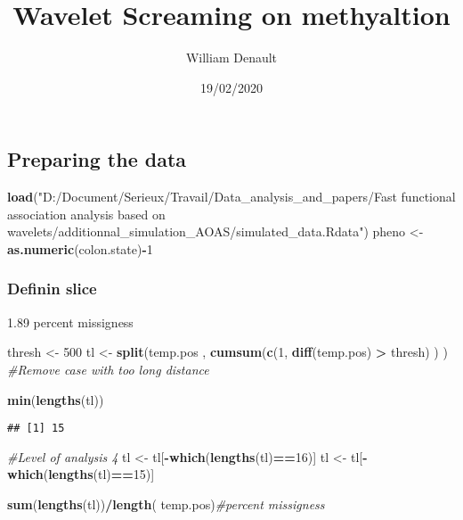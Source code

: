 \documentclass[
]{article}
\title{Wavelet Screaming on methyaltion}
\author{William Denault}
\date{19/02/2020}
\newenvironment{Shaded}{\begin{snugshade}}{\end{snugshade}}
\newcommand{\CommentTok}[1]{\textcolor[rgb]{0.56,0.35,0.01}{\textit{#1}}}
\newcommand{\DecValTok}[1]{\textcolor[rgb]{0.00,0.00,0.81}{#1}}
\newcommand{\KeywordTok}[1]{\textcolor[rgb]{0.13,0.29,0.53}{\textbf{#1}}}
\newcommand{\NormalTok}[1]{#1}
\newcommand{\OperatorTok}[1]{\textcolor[rgb]{0.81,0.36,0.00}{\textbf{#1}}}
\newcommand{\StringTok}[1]{\textcolor[rgb]{0.31,0.60,0.02}{#1}}
\begin{document}
\maketitle

\hypertarget{preparing-the-data}{%
\subsection{Preparing the data}\label{preparing-the-data}}

\begin{Shaded}
\begin{Highlighting}[]
\KeywordTok{load}\NormalTok{(}\StringTok{"D:/Document/Serieux/Travail/Data_analysis_and_papers/Fast functional association analysis based on wavelets/additionnal_simulation_AOAS/simulated_data.Rdata"}\NormalTok{)}
\NormalTok{pheno <-}\StringTok{ }\KeywordTok{as.numeric}\NormalTok{(colon.state)}\OperatorTok{-}\DecValTok{1}
\end{Highlighting}
\end{Shaded}

\hypertarget{definin-slice}{%
\subsubsection{Definin slice}\label{definin-slice}}

1.89 percent missigness

\begin{Shaded}
\begin{Highlighting}[]
\NormalTok{thresh <-}\StringTok{ }\DecValTok{500}
\NormalTok{tl <-}\StringTok{ }\KeywordTok{split}\NormalTok{(temp.pos , }\KeywordTok{cumsum}\NormalTok{(}\KeywordTok{c}\NormalTok{(}\DecValTok{1}\NormalTok{, }\KeywordTok{diff}\NormalTok{(temp.pos) }\OperatorTok{>}\StringTok{ }\NormalTok{thresh)  ) ) }\CommentTok{#Remove case with too long distance}

\KeywordTok{min}\NormalTok{(}\KeywordTok{lengths}\NormalTok{(tl))}
\end{Highlighting}
\end{Shaded}

\begin{verbatim}
## [1] 15
\end{verbatim}

\begin{Shaded}
\begin{Highlighting}[]
\CommentTok{#Level of analysis 4}
\NormalTok{tl <-}\StringTok{  }\NormalTok{tl[}\OperatorTok{-}\KeywordTok{which}\NormalTok{(}\KeywordTok{lengths}\NormalTok{(tl)}\OperatorTok{==}\DecValTok{16}\NormalTok{)]}
\NormalTok{tl <-}\StringTok{  }\NormalTok{tl[}\OperatorTok{-}\KeywordTok{which}\NormalTok{(}\KeywordTok{lengths}\NormalTok{(tl)}\OperatorTok{==}\DecValTok{15}\NormalTok{)]}

\KeywordTok{sum}\NormalTok{(}\KeywordTok{lengths}\NormalTok{(tl))}\OperatorTok{/}\KeywordTok{length}\NormalTok{( temp.pos)}\CommentTok{#percent missigness}
\end{Highlighting}
\end{Shaded}
\end{document}
